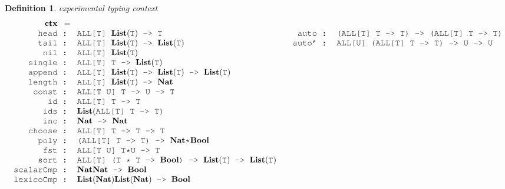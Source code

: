 \documentclass[acmsmall]{acmart}
\theoremstyle{definition}
\newtheorem{definition}{Definition}[section]
\begin{document}
\begin{definition} 
  \label{def:experimental_typing_context}
  \emph{experimental typing context}
  \tiny
  \nopad
  \[
  \begin{array}[t]{ll}
    \begin{array}[t]{r@{}c@{}l}
      \textbf{ctx} & = &  \hfill
      \\
      \J{head} &\J{ : }& \J{ALL[T] }\textbf{List}(\J{T})\J{ -> T}
      \\
      \J{tail} &\J{ : }& \J{ALL[T] }\textbf{List}(\J{T})\J{ -> }\textbf{List}(\J{T})
      \\
      \J{nil} &\J{ : }& \J{ALL[T] }\textbf{List}(\J{T})
      \\
      \J{single} &\J{ : }& \J{ALL[T] T -> }\textbf{List}(\J{T})
      \\
      \J{append} &\J{ : }& \J{ALL[T] }\textbf{List}(\J{T}) \J{ -> } \textbf{List}(\J{T}) \J{ -> } \textbf{List}(\J{T})
      \\
      \J{length} &\J{ : }& \J{ALL[T] }\textbf{List}(\J{T}) \J{ -> } \textbf{Nat}
      \\
      \J{const} &\J{ : }& \J{ALL[T U] T -> U -> T}
      \\
      \J{id} &\J{ : }& \J{ALL[T] T -> T}
      \\
      \J{ids} &\J{ : }& \textbf{List}(\J{ALL[T] T -> T}\J{)}
      \\
      \J{inc} &\J{ : }& \textbf{Nat}\J{ -> }\textbf{Nat}
      \\
      \J{choose} &\J{ : }& \J{ALL[T] T -> T -> T}
      \\
      \J{poly} &\J{ : }& \J{(ALL[T] T -> T) -> } \textbf{Nat}\J{*}\textbf{Bool}
      \\
      \J{fst} &\J{ : }& \J{ALL[T U] T*U -> T}
      \\
      \J{sort} &\J{ : }& \J{ALL[T] (T * T -> } \textbf{Bool} \J{) -> }\textbf{List}(\J{T})\J{ -> }\textbf{List}(\J{T})
      \\
      \J{scalarCmp} &\J{ : }& \textbf{Nat} \J{\*} \textbf{Nat} \J{ -> } \textbf{Bool} 
      \\
      \J{lexicoCmp} &\J{ : }& \textbf{List}(\textbf{Nat}) \J{\*} \textbf{List}(\textbf{Nat}) \J{ -> } \textbf{Bool} 
    \end{array}
    &
    \begin{array}[t]{r@{}c@{}l}
      \\
      \J{auto} &\J{ : }& \J{(ALL[T] T -> T) -> (ALL[T] T -> T)}
      \\
      \J{auto'} &\J{ : }& \J{ALL[U] (ALL[T] T -> T) -> U -> U}

\end{array}
\end{array}\]
\end{definition}
\end{document}
